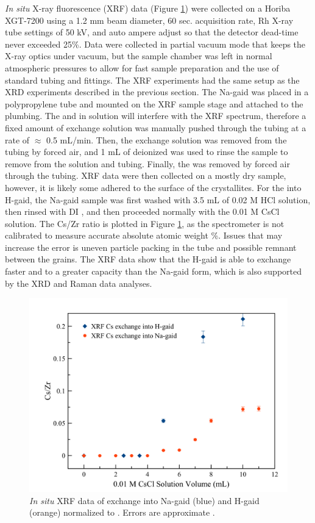 \documentclass[journal=acsodf,manuscript=article]{achemso}
\begin{document}
\emph{In situ} X-ray fluorescence (XRF) data
(Figure {\ref{fig_XRF}}) were collected on a Horiba
XGT-7200 using a 1.2 mm beam diameter, 60 sec. acquisition rate, Rh
X-ray tube settings of  50 kV, and auto ampere adjust so that the
detector dead-time never exceeded 25\%.  Data were collected in partial
vacuum mode that keeps the X-ray optics under vacuum, but the sample
chamber was left in normal atmospheric pressures to allow for fast
sample preparation and the use of standard tubing and fittings. The XRF
experiments had the same setup as the XRD experiments described in the
previous section.  The Na-gaid was placed in a polypropylene tube and
mounted on the XRF sample stage and attached to the plumbing.  The
 and  in solution will interfere
with the XRF spectrum, therefore a fixed amount of exchange solution was
manually pushed through the tubing at a rate of \(\approx\) 0.5
mL/min.  Then, the exchange solution was removed from the tubing by
forced air,  and 1 mL of deionized  was used to rinse
the sample to remove  from the solution and
tubing.  Finally, the  was removed by forced air
through the tubing.  XRF data were then collected on a mostly dry sample,
however, it is likely some  adhered to the surface of the
crystallites.  For the  into H-gaid, the Na-gaid
sample was first washed with 3.5 mL of 0.02 M HCl solution, then rinsed
with DI , and then proceeded normally with the 0.01 M
CsCl solution.  The Cs/Zr ratio is plotted in
Figure {\ref{fig_XRF}}, as the spectrometer is not
calibrated to measure accurate absolute atomic weight \%.  Issues that may increase the
error is uneven particle packing in the tube and possible remnant
 between the grains.  The XRF data show that the
H-gaid is able to exchange  faster and to a greater
capacity than the Na-gaid form, which is also supported by the XRD and
Raman data analyses. 


\begin{figure}[h!]  %
\begin{center}
\includegraphics[width=0.70\columnwidth]{figures/XRF_Cs_into_Na_and_H_forms.png}
\caption{{\emph{In situ} XRF data of  exchange into Na-gaid
(blue) and H-gaid (orange) normalized to .  
Errors are approximate .
{\label{fig_XRF}}%
}}
\end{center}
\end{figure}
\end{document}
